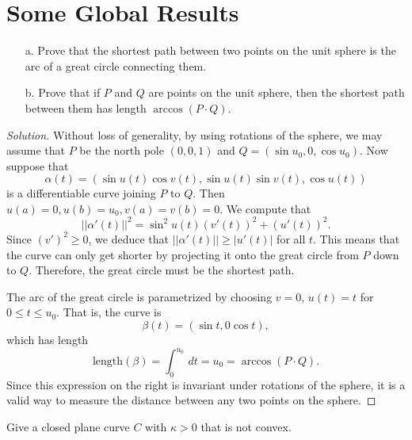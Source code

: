 \documentclass[Shifrin_Solutions_Spring_2018]{subfiles}
\begin{document}
\section{Some Global Results}

\begin{exercise}
\begin{itemize}
\item[a.] Prove that the shortest path between two points on the unit sphere is the arc of a great circle connecting them.
\item[b.] Prove that if $P$ and $Q$ are points on the unit sphere, then the shortest path between them has length $\arccos(P\cdot Q)$.
\end{itemize}
\end{exercise}


\begin{proof}[Solution] Without loss of generality, by using rotations of the sphere, we may assume that $P$ be the north pole $(0,0,1)$ and $Q = (\sin u_0, 0 , \cos u_0)$. Now suppose that
\[
\alpha(t) = \left( \sin u(t) \cos v(t) , \sin u(t) \sin v(t) , \cos u(t) \right)
\]
is a differentiable curve joining $P$ to $Q$. Then $u(a)  = 0, u(b)=u_0, v(a)=v(b) =0$. We compute that
\[
||\alpha'(t)||^2 = \sin^2 u(t) (v'(t))^2 + (u'(t))^2 .
\]
Since $(v')^2\geq 0$, we deduce that $||\alpha'(t)|| \geq |u'(t)|$ for all $t$. This means that the curve can only get shorter by projecting it onto the great circle from $P$ down to $Q$. Therefore, the great circle must be the shortest path.

The arc of the great circle is parametrized by choosing $v=0$, $u(t) = t$ for $0 \leq t \leq u_0$. That is, the curve is
\[
\beta(t) = \left(\sin t, 0 \cos t \right),
\]
which has length
\[
\mathrm{length}(\beta) = \int_0^{u_0} \, dt = u_0 = \arccos(P\cdot Q).
\]
Since this expression on the right is invariant under rotations of the sphere, it is a valid way to measure the distance between any two points on the sphere.
\end{proof}

\begin{exercise} Give a closed plane curve $C$ with $\kappa>0$ that is not convex.
\end{exercise}
\end{document}
